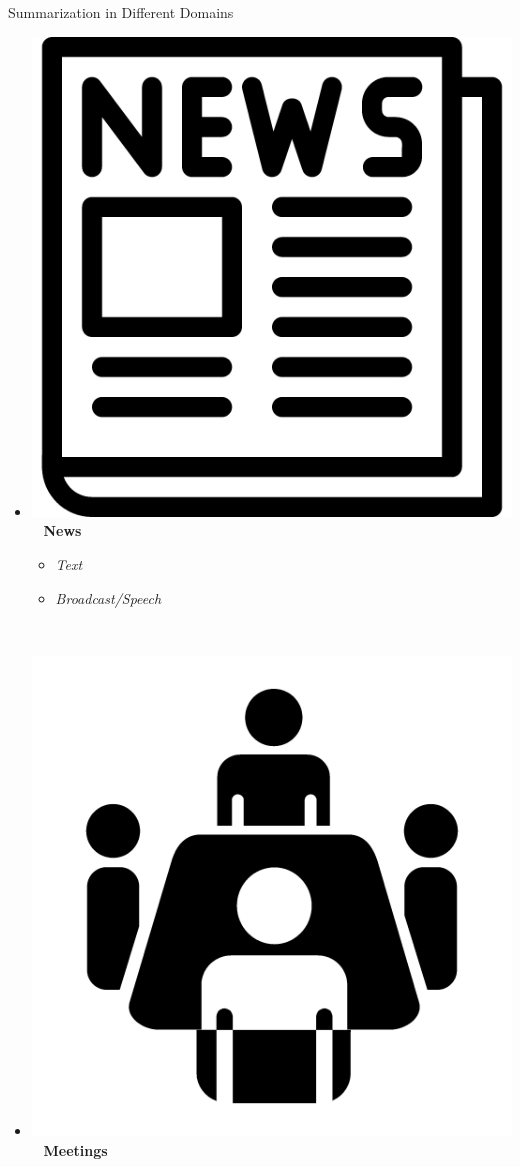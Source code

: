 \documentclass[xcolor={table}]{beamer}
\begin{document}
\begin{frame}{Summarization in Different Domains}
  \begin{itemize}
    \item[] \includegraphics[scale=.017]{news_icon}~ \textbf{News} 
      \begin{itemize}
        \item \textit{Text }
            {\fontsize{6.8pt}{12pt}\selectfont\citep{lin2000automated,erkan2004lexrank,conroy2005classy,lin2011class}}
        \item \textit{Broadcast/Speech} {\scriptsize\citep{maskey2005comparing}}
    \end{itemize}
~\\
\item[] \includegraphics[scale=.02]{meeting_icon}~ \textbf{Meetings  } 

\end{itemize}
\end{frame}
\end{document}
